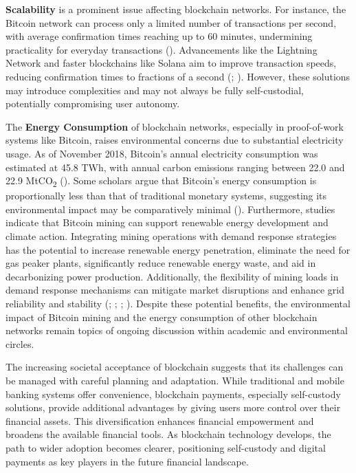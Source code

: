 \documentclass[twocolumn]{article}
\begin{document}
\textbf{Scalability} is a prominent issue affecting blockchain networks. For instance, the Bitcoin network can process only a limited number of transactions per second, with average confirmation times reaching up to 60 minutes, undermining practicality for everyday transactions (\cite{hazari_parallel_2019}). Advancements like the Lightning Network and faster blockchains like Solana aim to improve transaction speeds, reducing confirmation times to fractions of a second (\cite{duffy_can_2021}; \cite{seres_topological_2020}). However, these solutions may introduce complexities and may not always be fully self-custodial, potentially compromising user autonomy.

The \textbf{Energy Consumption} of blockchain networks, especially in proof-of-work systems like Bitcoin, raises environmental concerns due to substantial electricity usage. As of November 2018, Bitcoin's annual electricity consumption was estimated at 45.8 TWh, with annual carbon emissions ranging between 22.0 and 22.9 MtCO\textsubscript{2} (\cite{stoll_carbon_2019}). Some scholars argue that Bitcoin's energy consumption is proportionally less than that of traditional monetary systems, suggesting its environmental impact may be comparatively minimal (\cite{khazzaka_bitcoin_2022}). Furthermore, studies indicate that Bitcoin mining can support renewable energy development and climate action. Integrating mining operations with demand response strategies has the potential to increase renewable energy penetration, eliminate the need for gas peaker plants, significantly reduce renewable energy waste, and aid in decarbonizing power production. Additionally, the flexibility of mining loads in demand response mechanisms can mitigate market disruptions and enhance grid reliability and stability (\cite{kapengut_event_2023}; \cite{lal_mining_2023}; \cite{hajiaghapour-moghimi_cryptocurrency_2024}; \cite{menati_high_2023}). Despite these potential benefits, the environmental impact of Bitcoin mining and the energy consumption of other blockchain networks remain topics of ongoing discussion within academic and environmental circles.

The increasing societal acceptance of blockchain suggests that its challenges can be managed with careful planning and adaptation. While traditional and mobile banking systems offer convenience, blockchain payments, especially self-custody solutions, provide additional advantages by giving users more control over their financial assets. This diversification enhances financial empowerment and broadens the available financial tools. As blockchain technology develops, the path to wider adoption becomes clearer, positioning self-custody and digital payments as key players in the future financial landscape.
\end{document}
